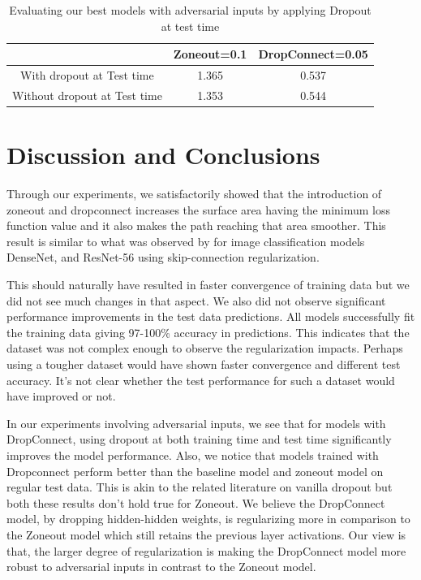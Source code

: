 \documentclass{article}
\begin{document}
\begin{table}[h]
	\begin{center}
		\begin{tabular}{c|c|c} %
			\textbf{} & \textbf{Zoneout=0.1} & \textbf{DropConnect=0.05}\\
			\hline
			With dropout at Test time & 1.365 & 0.537\\
			Without dropout at Test time & 1.353 & 0.544\\
		\end{tabular}
		\medskip
		\caption{Evaluating our best models with adversarial inputs by applying Dropout at test time}
		\label{tab:exp2}
	\end{center}
\end{table}

\section{Discussion and Conclusions}

Through our experiments, we satisfactorily showed that the introduction of zoneout and dropconnect increases the surface area having the minimum loss function value and it also makes the path reaching that area smoother. This result is similar to what was observed by \cite{li2018visualizing} for image classification models DenseNet, and ResNet-56 using skip-connection regularization.

This should naturally have resulted in faster convergence of training data but we did not see much changes in that aspect. We also did not observe significant performance improvements in the test data predictions. All models successfully fit the training data giving 97-100\% accuracy in predictions. This indicates that the dataset was not complex enough to observe the regularization impacts. Perhaps using a tougher dataset would have shown faster convergence and different test accuracy. It's not clear whether the test performance for such a dataset would have improved or not.

In our experiments involving adversarial inputs, we see that for models with DropConnect, using dropout at both training time and test time significantly improves the model performance. Also, we notice that models trained with Dropconnect perform better than the baseline model and zoneout model on regular test data. This is akin to the related literature on vanilla dropout but both these results don't hold true for Zoneout. We believe the DropConnect model, by dropping hidden-hidden weights, is regularizing more in comparison to the Zoneout model which still retains the previous layer activations. Our view is that, the larger degree of regularization is making the DropConnect model more robust to adversarial inputs in contrast to the Zoneout model. 
\end{document}
